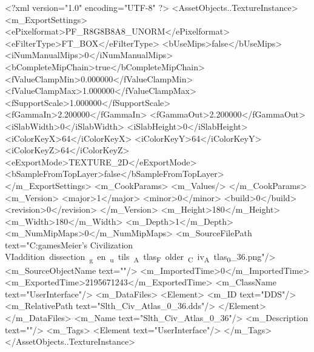 <?xml version="1.0" encoding="UTF-8" ?>
<AssetObjects..TextureInstance>
	<m_ExportSettings>
		<ePixelformat>PF_R8G8B8A8_UNORM</ePixelformat>
		<eFilterType>FT_BOX</eFilterType>
		<bUseMips>false</bUseMips>
		<iNumManualMips>0</iNumManualMips>
		<bCompleteMipChain>true</bCompleteMipChain>
		<fValueClampMin>0.000000</fValueClampMin>
		<fValueClampMax>1.000000</fValueClampMax>
		<fSupportScale>1.000000</fSupportScale>
		<fGammaIn>2.200000</fGammaIn>
		<fGammaOut>2.200000</fGammaOut>
		<iSlabWidth>0</iSlabWidth>
		<iSlabHeight>0</iSlabHeight>
		<iColorKeyX>64</iColorKeyX>
		<iColorKeyY>64</iColorKeyY>
		<iColorKeyZ>64</iColorKeyZ>
		<eExportMode>TEXTURE_2D</eExportMode>
		<bSampleFromTopLayer>false</bSampleFromTopLayer>
	</m_ExportSettings>
	<m_CookParams>
		<m_Values/>
	</m_CookParams>
	<m_Version>
		<major>1</major>
		<minor>0</minor>
		<build>0</build>
		<revision>0</revision>
	</m_Version>
	<m_Height>180</m_Height>
	<m_Width>180</m_Width>
	<m_Depth>1</m_Depth>
	<m_NumMipMaps>0</m_NumMipMaps>
	<m_SourceFilePath text="C:\Users\Sam\Documents\my games\Sid Meier's Civilization VI\Mods\unit addition dissection\python_gen\build_utils\CIV_Atlas_Folder\Slth_Civ_Atlas_0_36.png"/>
	<m_SourceObjectName text=""/>
	<m_ImportedTime>0</m_ImportedTime>
	<m_ExportedTime>2195671243</m_ExportedTime>
	<m_ClassName text="UserInterface"/>
	<m_DataFiles>
		<Element>
			<m_ID text="DDS"/>
			<m_RelativePath text="Slth_Civ_Atlas_0_36.dds"/>
		</Element>
	</m_DataFiles>
	<m_Name text="Slth_Civ_Atlas_0_36"/>
	<m_Description text=""/>
	<m_Tags>
		<Element text="UserInterface"/>
	</m_Tags>
</AssetObjects..TextureInstance>

